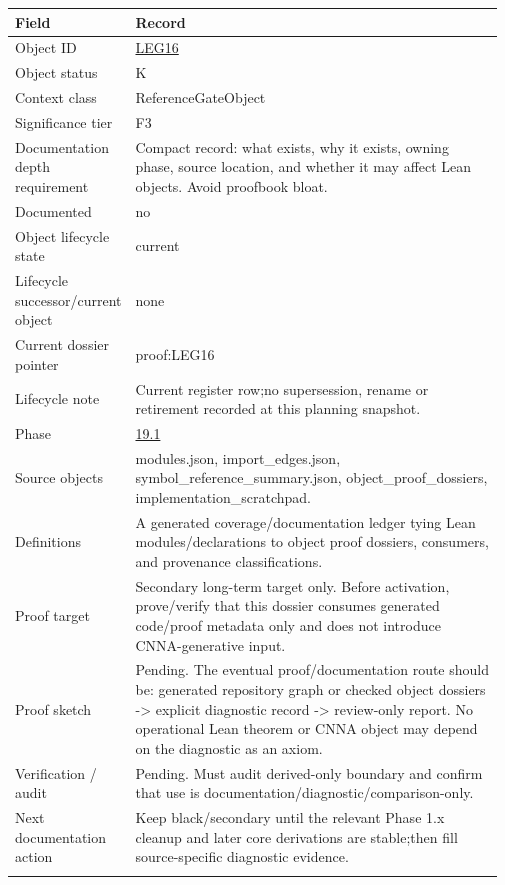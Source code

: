 \begin{longtable}{L{0.16\linewidth} L{0.81\linewidth}}
\hline
\textbf{Field} & \textbf{Record}\\
\hline
Object ID & \hyperlink{object-row-LEG16}{LEG16}\\
\hline\addlinespace[0.20em]
Object status & K\\
\hline\addlinespace[0.20em]
Context class & ReferenceGateObject\\
\hline\addlinespace[0.20em]
Significance tier & F3\\
\hline\addlinespace[0.20em]
Documentation depth requirement & Compact record: what exists, why it exists, owning phase, source location, and whether it may affect Lean objects. Avoid proofbook bloat.\\
\hline\addlinespace[0.20em]
Documented & no\\
\hline\addlinespace[0.20em]
Object lifecycle state & current\\
\hline\addlinespace[0.20em]
Lifecycle successor/\allowbreak{}current object & none\\
\hline\addlinespace[0.20em]
Current dossier pointer & proof:LEG16\\
\hline\addlinespace[0.20em]
Lifecycle note & Current register row;\newline no supersession, rename or retirement recorded at this planning snapshot.\\
\hline\addlinespace[0.20em]
Phase & \hyperlink{phase-row-19-1}{19.1}\\
\hline\addlinespace[0.20em]
Source objects & modules.json, import\_edges.json, symbol\_reference\_summary.json, object\_proof\_dossiers, implementation\_scratchpad.\\
\hline\addlinespace[0.20em]
Definitions & A generated coverage/\allowbreak{}documentation ledger tying Lean modules/\allowbreak{}declarations to object proof dossiers, consumers, and provenance classifications.\\
\hline\addlinespace[0.20em]
Proof target & Secondary long-term target only. Before activation, prove/\allowbreak{}verify that this dossier consumes generated code/\allowbreak{}proof metadata only and does not introduce CNNA-generative input.\\
\hline\addlinespace[0.20em]
Proof sketch & Pending. The eventual proof/\allowbreak{}documentation route should be: generated repository graph or checked object dossiers -> explicit diagnostic record -> review-only report. No operational Lean theorem or CNNA object may depend on the diagnostic as an axiom.\\
\hline\addlinespace[0.20em]
Verification /\allowbreak{} audit & Pending. Must audit derived-only boundary and confirm that use is documentation/\allowbreak{}diagnostic/\allowbreak{}comparison-only.\\
\hline\addlinespace[0.20em]
Next documentation action & Keep black/\allowbreak{}secondary until the relevant Phase 1.x cleanup and later core derivations are stable;\newline then fill source-specific diagnostic evidence.\\
\hline\addlinespace[0.20em]
\end{longtable}
